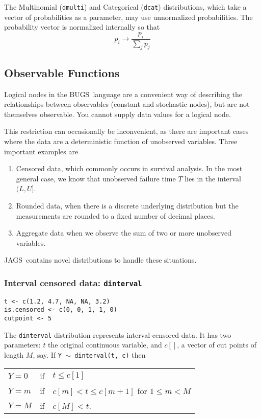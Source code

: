 \documentclass[11pt, a4paper, titlepage]{report}
\newcommand{\JAGS}{\textsf{JAGS}}
\newcommand{\BUGS}{\textsf{BUGS}}
\begin{document}
The Multinomial (\verb+dmulti+) and Categorical (\verb+dcat+)
distributions, which take a vector of probabilities as a parameter,
may use unnormalized probabilities. The probability vector is
normalized internally so that
\[
p_i \rightarrow \frac{p_i}{\sum_j p_j}
\]

\subsection{Observable Functions}
\label{section:obfun}

Logical nodes in the \BUGS\ language are a convenient way of
describing the relationships between observables (constant and
stochastic nodes), but are not themselves observable. You cannot
supply data values for a logical node.  

This restriction can occasionally be inconvenient, as there are
important cases where the data are a deterministic function of
unobserved variables.  Three important examples are
\begin{enumerate}
\item Censored data, which commonly occurs in survival analysis. In
the most general case, we know that unobserved failure time $T$
lies in the interval $(L,U]$.
\item Rounded data, when there is a discrete underlying distribution
but the measurements are rounded to a fixed number of decimal places.
\item Aggregate data when we observe the sum of two or more
unobserved variables.
\end{enumerate}
\JAGS\ contains novel distributions to handle these situations.  

\subsubsection{Interval censored data: \texttt{dinterval}}

\begin{verbatim}
t <- c(1.2, 4.7, NA, NA, 3.2)
is.censored <- c(0, 0, 1, 1, 0)
cutpoint <- 5
\end{verbatim}

The \texttt{dinterval} distribution represents interval-censored
data. It has two parameters: $t$ the original continuous variable, and
$c[]$, a vector of cut points of length $M$, say. If \texttt{Y $\sim$
  dinterval(t, c)} then

\begin{tabular}{lll}
$Y=0$   & if & $t \leq c[1]$\\
$Y=m$   & if & $c[m] < t \leq c[m+1]$ for $1 \leq m < M$\\
$Y = M$ & if & $c[M] < t$.
\end{tabular}
\end{document}

